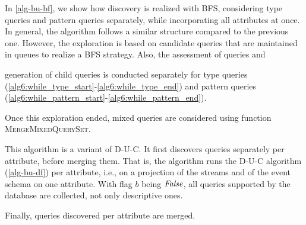 In \autoref{alg-bu-bf}, we show how discovery is realized with BFS,
considering type queries and pattern queries separately, while incorporating
all attributes at once. In general, the algorithm follows a similar
structure compared to the previous one. However, the exploration is based on
candidate queries that are maintained in queues to realize a BFS strategy.
Also, the assessment of queries and

generation of child queries is conducted separately for
type queries (\autoref{alg6:while_type_start}-\ref{alg6:while_type_end}) and
pattern queries
(\autoref{alg6:while_pattern_start}-\ref{alg6:while_pattern_end}).

Once this exploration ended, mixed queries are
considered using function \textsc{MergeMixedQuerySet}.


This algorithm is a variant of D-U-C.
It first discovers queries separately per attribute, before merging
them. That is, the algorithm runs the D-U-C algorithm
(\autoref{alg-bu-df}) per attribute, i.e., on a projection of the streams
and of the event schema on one attribute. With flag $b$ being
$\mathit{False}$, all queries supported by the database are collected, not only
descriptive ones.

Finally, queries discovered per attribute are merged.


